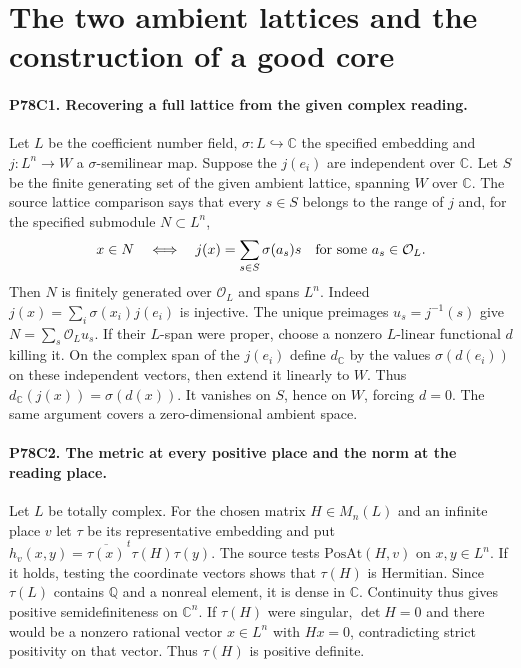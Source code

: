 \section{The two ambient lattices and the construction of a good core}

\paragraph{P78C1. Recovering a full lattice from the given complex reading.}
Let $L$ be the coefficient number field, $\sigma:L\hookrightarrow
\mathbb C$ the specified embedding and $j:L^n\to W$ a
$\sigma$-semilinear map. Suppose the $j(e_i)$ are independent over
$\mathbb C$. Let $S$ be the finite generating set of the given
ambient lattice, spanning $W$ over $\mathbb C$. The source
lattice comparison says that every $s\in S$ belongs to the range
of $j$ and, for the specified submodule $N\subset L^n$,
\[
 x\in N \quad\Longleftrightarrow\quad
 j(x)=\sum_{s\in S}\sigma(a_s)s
 \quad\hbox{for some }a_s\in\mathcal O_L .
\]
Then $N$ is finitely generated over $\mathcal O_L$ and spans $L^n$.
Indeed $j(x)=\sum_i\sigma(x_i)j(e_i)$ is injective. The unique
preimages $u_s=j^{-1}(s)$ give
$N=\sum_s\mathcal O_L u_s$. If their $L$-span were proper,
choose a nonzero $L$-linear functional $d$ killing it. On the
complex span of the $j(e_i)$ define $d_{\mathbb C}$ by the values
$\sigma(d(e_i))$ on these independent vectors, then extend it
linearly to $W$. Thus $d_{\mathbb C}(j(x))=\sigma(d(x))$.
It vanishes on $S$, hence on $W$, forcing $d=0$. The same
argument covers a zero-dimensional ambient space.

\paragraph{P78C2. The metric at every positive place and the norm at the reading place.}
Let $L$ be totally complex. For the chosen matrix $H\in M_n(L)$
and an infinite place $v$ let $\tau$ be its representative embedding
and put $h_v(x,y)=\overline{\tau(x)}^{\,t}\tau(H)\tau(y)$.
The source tests $\mathrm{PosAt}(H,v)$ on $x,y\in L^n$.
If it holds, testing the coordinate vectors shows that $\tau(H)$
is Hermitian. Since $\tau(L)$ contains $\mathbb Q$ and a nonreal
element, it is dense in $\mathbb C$. Continuity thus gives
positive semidefiniteness on $\mathbb C^n$. If $\tau(H)$ were
singular, $\det H=0$ and there would be a nonzero rational vector
$x\in L^n$ with $Hx=0$, contradicting strict positivity on
that vector. Thus $\tau(H)$ is positive definite.

